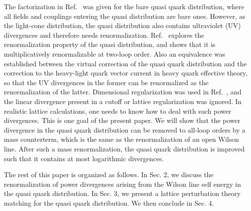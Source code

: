 The factorization in Ref.~\cite{Xiong:2013bka} was given for the bare quasi quark distribution, where all fields and couplings entering the quasi distribution are bare ones. However, as the light-cone distribution, the quasi distribution also contains ultraviolet (UV) divergences and therefore needs renormalization. Ref.~\cite{Ji:2015jwa} explores the renormalization property of the quasi distribution, and shows that it is multiplicatively renormalizable at two-loop order. Also an equivalence was established between the virtual correction of the quasi quark distribution and the correction to the heavy-light quark vector current in heavy quark effective theory, so that the UV divergences in the former can be renormalized as the renormalization of the latter. Dimensional regularization was used in Ref.~\cite{Ji:2015jwa}, and the linear divergence present in a cutoff or lattice regularization was ignored. In realistic lattice calculations, one needs to know how to deal with such power divergences. This is one goal of the present paper. We will show that the power divergence in the quasi quark distribution can be removed to all-loop orders by a mass counterterm, which is the same as the renormalization of an open Wilson line. After such a mass renormalization, the quasi quark distribution is improved such that it contains at most logarithmic divergences.

The rest of this paper is organized as follows. In Sec. 2, we discuss the renormalization of power divergences arising from the Wilson line self energy in the quasi quark distribution. In Sec. 3, we present a lattice perturbation theory matching for the quasi quark distribution. We then conclude in Sec. 4.


